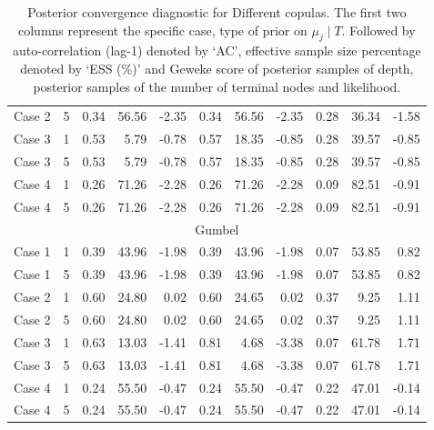 \documentclass{amsart}
\begin{document}
\begin{table}[ht]
{\begin{tabular}{lc|crr|crr|crr}
			Case 2 & 5 & 0.34 & 56.56 & -2.35 & 0.34 & 56.56 & -2.35 & 0.28 & 36.34 & -1.58 \\ 
			Case 3 & 1 & 0.53 & 5.79 & -0.78 & 0.57 & 18.35 & -0.85 & 0.28 & 39.57 & -0.85 \\ 
			Case 3 & 5 & 0.53 & 5.79 & -0.78 & 0.57 & 18.35 & -0.85 & 0.28 & 39.57 & -0.85 \\ 
			Case 4 & 1 & 0.26 & 71.26 & -2.28 & 0.26 & 71.26 & -2.28 & 0.09 & 82.51 & -0.91 \\ 
			Case 4 & 5 & 0.26 & 71.26 & -2.28 & 0.26 & 71.26 & -2.28 & 0.09 & 82.51 & -0.91 \\ 
			\midrule
			\multicolumn{11}{c}{Gumbel} \\
			\midrule
			Case 1 & 1 & 0.39 & 43.96 & -1.98 & 0.39 & 43.96 & -1.98 & 0.07 & 53.85 & 0.82 \\ 
			Case 1 & 5 & 0.39 & 43.96 & -1.98 & 0.39 & 43.96 & -1.98 & 0.07 & 53.85 & 0.82 \\ 
			Case 2 & 1 & 0.60 & 24.80 & 0.02 & 0.60 & 24.65 & 0.02 & 0.37 & 9.25 & 1.11 \\ 
			Case 2 & 5 & 0.60 & 24.80 & 0.02 & 0.60 & 24.65 & 0.02 & 0.37 & 9.25 & 1.11 \\ 
			Case 3 & 1 & 0.63 & 13.03 & -1.41 & 0.81 & 4.68 & -3.38 & 0.07 & 61.78 & 1.71 \\ 
			Case 3 & 5 & 0.63 & 13.03 & -1.41 & 0.81 & 4.68 & -3.38 & 0.07 & 61.78 & 1.71 \\ 
			Case 4 & 1 & 0.24 & 55.50 & -0.47 & 0.24 & 55.50 & -0.47 & 0.22 & 47.01 & -0.14 \\ 
			Case 4 & 5 & 0.24 & 55.50 & -0.47 & 0.24 & 55.50 & -0.47 & 0.22 & 47.01 & -0.14 \\ 
			\bottomrule
	\end{tabular}
\caption{Posterior convergence diagnostic for Different copulas. The first two columns represent the specific case, type of prior on $\mu_j\mid T$. Followed by auto-correlation (lag-1) denoted by `AC', effective sample size percentage denoted by `ESS (\%)' and Geweke score of posterior samples of depth, posterior samples of the number of terminal nodes and likelihood.}\label{tab:gauss:convergence}}
\end{table}

\appendix
\end{document}
